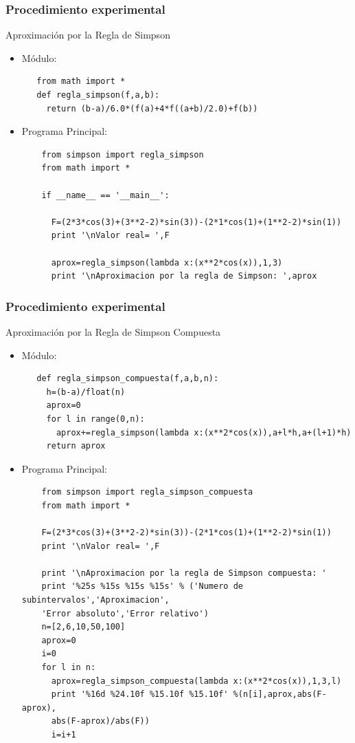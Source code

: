 \documentclass{beamer}
\begin{document}
\begin{frame}
\frametitle{Procedimiento experimental}
  \begin{block}{Aproximación por la Regla de Simpson}
  \begin{itemize}
   \item Módulo:
   \begin{verbatim}
   from math import *
   def regla_simpson(f,a,b):
     return (b-a)/6.0*(f(a)+4*f((a+b)/2.0)+f(b))
  \end{verbatim}
  \item Programa Principal:
  \begin{verbatim}
    from simpson import regla_simpson
    from math import *

    if __name__ == '__main__':
  
      F=(2*3*cos(3)+(3**2-2)*sin(3))-(2*1*cos(1)+(1**2-2)*sin(1))
      print '\nValor real= ',F

      aprox=regla_simpson(lambda x:(x**2*cos(x)),1,3)
      print '\nAproximacion por la regla de Simpson: ',aprox

  \end{verbatim}
  \end{itemize}

  \end{block}
\end{frame}

\begin{frame}
\frametitle{Procedimiento experimental}
  \begin{block}{Aproximación por la Regla de Simpson Compuesta}
  \begin{itemize}
   \item Módulo:
   \begin{verbatim}
   def regla_simpson_compuesta(f,a,b,n):
     h=(b-a)/float(n)
     aprox=0
     for l in range(0,n):
       aprox+=regla_simpson(lambda x:(x**2*cos(x)),a+l*h,a+(l+1)*h)
     return aprox
  \end{verbatim}
  \item Programa Principal:
  \begin{verbatim}
    from simpson import regla_simpson_compuesta
    from math import *

    F=(2*3*cos(3)+(3**2-2)*sin(3))-(2*1*cos(1)+(1**2-2)*sin(1))
    print '\nValor real= ',F

    print '\nAproximacion por la regla de Simpson compuesta: '
    print '%25s %15s %15s %15s' % ('Numero de subintervalos','Aproximacion',
    'Error absoluto','Error relativo')
    n=[2,6,10,50,100]
    aprox=0
    i=0
    for l in n:
      aprox=regla_simpson_compuesta(lambda x:(x**2*cos(x)),1,3,l)
      print '%16d %24.10f %15.10f %15.10f' %(n[i],aprox,abs(F-aprox),
      abs(F-aprox)/abs(F))
      i=i+1

  \end{verbatim}
  \end{itemize}

  \end{block}
\end{frame}
\end{document}
